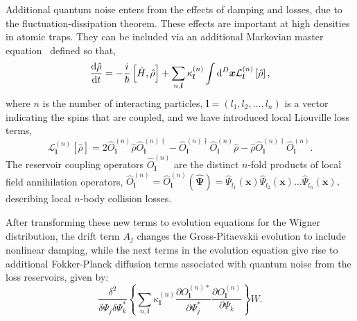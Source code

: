 \documentclass[doublecol]{epl2}
\newcommand{\xvec}{\boldsymbol{x}}
\newcommand{\lvec}{\boldsymbol{l}}
\newcommand{\Psivec}{\boldsymbol{\Psi}}
\begin{document}
Additional quantum noise enters from the effects of damping and losses,
due to the fluctuation-dissipation theorem.
These effects are important at high densities in atomic traps.
They can be included via an additional Markovian master equation~\cite{Jack2002}
defined so that,
\begin{equation}
	\frac{\upd\hat{\rho}}{\upd t} =
		- \frac{i}{\hbar} \left[ \hat{H}, \hat{\rho} \right]
		+ \sum_{n,\lvec} \kappa_{\lvec}^{(n)} \int \upd^{D}\xvec
			\mathcal{L}_{\lvec}^{(n)} \left[ \hat{\rho} \right],
\end{equation}
where $n$ is the number of interacting particles,
$\lvec = (l_1, l_2, \ldots, l_n)$ is a vector indicating the spins that are coupled,
and we have introduced local Liouville loss terms,
\begin{equation}
	\mathcal{L}_{\lvec}^{(n)} \left[ \hat{\rho} \right] =
		2\hat{O}_{\lvec}^{(n)} \hat{\rho} \hat{O}_{\lvec}^{(n)\dagger}
		- \hat{O}_{\lvec}^{(n)\dagger} \hat{O}_{\lvec}^{(n)} \hat{\rho}
		- \hat{\rho} \hat{O}_{\lvec}^{(n)\dagger} \hat{O}_{\lvec}^{(n)}.
\end{equation}
The reservoir coupling operators $\hat{O}_{\lvec}^{(n)}$ are the distinct $n$-fold products of local field annihilation operators,
$\hat{O}_{\lvec}^{(n)} = \hat{O}_{\lvec}^{(n)} (\widehat{\Psivec}) =
	\widehat{\Psi}_{l_{1}} (\xvec)
	\widehat{\Psi}_{l_{2}} (\xvec) \ldots
	\widehat{\Psi}_{l_{n}} (\xvec),$
describing local $n$-body collision losses.

After transforming these new terms to evolution equations for the Wigner distribution, the drift term $A_j$
changes the Gross-Pitaevskii evolution to include nonlinear damping, while
the next terms in the evolution equation give rise to additional Fokker-Planck
diffusion terms associated with quantum noise from the loss reservoirs,
given by:
\begin{equation}
	\frac{\delta^{2}}{\delta\Psi_j\delta\Psi_k^{*}} \left\{
		\sum_{n,\lvec} \kappa_{\lvec}^{(n)}
			\frac{\partial O_{\lvec}^{(n)*}}{\partial\Psi_j^{*}}
			\frac{\partial O_{\lvec}^{(n)}}{\partial\Psi_k}
		\right\} W.
\end{equation}
\end{document}
